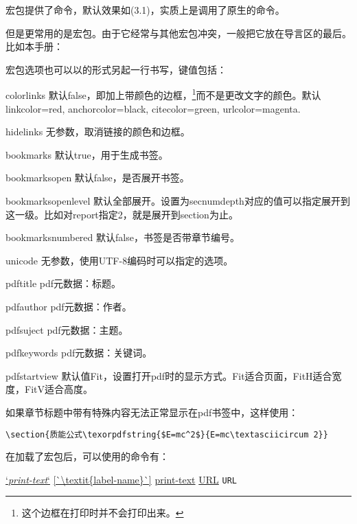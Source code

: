 宏包提供了命令，默认效果如(3.1)，实质上是调用了原生的命令。

但是更常用的是宏包。由于它经常与其他宏包冲突，一般把它放在导言区的最后。比如本手册：
\begin{latex}
\usepackage[colorlinks,bookmarksopen=true,
    bookmarksnumbered=true]{hyperref}
\end{latex}

宏包选项也可以以的形式另起一行书写，键值包括：
\begin{para}
\item[colorlinks] 默认false，即加上带颜色的边框，\footnote{这个边框在打印时并不会打印出来。}而不是更改文字的颜色。默认linkcolor=red, anchorcolor=black, citecolor=green, urlcolor=magenta. 
\item[hidelinks] 无参数，取消链接的颜色和边框。
\item[bookmarks] 默认true，用于生成书签。
\item[bookmarksopen] 默认false，是否展开书签。
\item[bookmarksopenlevel] 默认全部展开。设置为secnumdepth对应的值可以指定展开到这一级。比如对report指定2，就是展开到section为止。
\item[bookmarksnumbered] 默认false，书签是否带章节编号。
\item[unicode] 无参数，使用UTF-8编码时可以指定的选项。
\item[pdftitle] pdf元数据：标题。
\item[pdfauthor] pdf元数据：作者。
\item[pdfsuject] pdf元数据：主题。
\item[pdfkeywords] pdf元数据：关键词。
\item[pdfstartview] 默认值Fit，设置打开pdf时的显示方式。Fit适合页面，FitH适合宽度，FitV适合高度。
\end{para}

如果章节标题中带有特殊内容无法正常显示在pdf书签中，这样使用：

\begin{verbatim}
\section{质能公式\texorpdfstring{$E=mc^2$}{E=mc\textasciicircum 2}}
\end{verbatim}

在加载了宏包后，可以使用的命令有：
\begin{latex}
\hyperref[`\textit{label-name}`]{`\textit{print-text}`}
\autoref{`\textit{label-name}`} %
\href{URL}{print-text}
\url{URL} %
\nolinkurl{URL} %
\end{latex}

